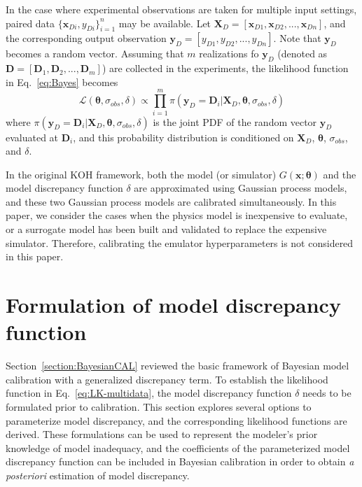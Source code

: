 \documentclass[preprint,review,12pt,3p]{elsarticle}
\begin{document}
In the case where experimental observations are taken for multiple input settings, paired data $\{ \boldsymbol{x}_{Di}, y_{Di} \}_{i=1}^{n}$ may be available. Let $\boldsymbol{X}_D = [ \boldsymbol{x}_{D1}, \boldsymbol{x}_{D2}, ..., \boldsymbol{x}_{Dn} ]$, and the corresponding output observation $\boldsymbol{y}_D =[ y_{D1}, y_{D2}, ..., y_{Dn} ]$. Note that $\boldsymbol{y}_D$ becomes a random vector. Assuming that $m$ realizations fo $\boldsymbol{y}_D$ (denoted as $\boldsymbol{D}=[\boldsymbol{D}_1, \boldsymbol{D}_2, ..., \boldsymbol{D}_m]$) are collected in the experiments, the likelihood function in Eq.~\ref{eq:Bayes} becomes
\begin{equation}\label{eq:LK-multidata}
\mathcal{L}(\boldsymbol{\theta},\sigma_{obs},\delta) \propto \prod_{i=1}^{m}\pi( \boldsymbol{y}_D=\boldsymbol{D}_i|\boldsymbol{X}_D,\boldsymbol{\theta},\sigma_{obs},\delta)
\end{equation}
where $\pi(\boldsymbol{y}_D=\boldsymbol{D}_i|\boldsymbol{X}_D,\boldsymbol{\theta},\sigma_{obs},\delta)$ is the joint PDF of the random vector $\boldsymbol{y}_D$ evaluated at $\boldsymbol{D}_i$, and this probability distribution is conditioned on $\boldsymbol{X}_D$, $\boldsymbol{\theta}$, $\sigma_{obs}$, and $\delta$.

In the original KOH framework, both the model (or simulator) $G(\boldsymbol{x};\boldsymbol{\theta})$ and the model discrepancy function $\delta$ are approximated using Gaussian process models, and these two Gaussian process models are calibrated simultaneously. In this paper, we consider the cases when the physics model is inexpensive to evaluate, or a surrogate model has been built and validated to replace the expensive simulator. Therefore, calibrating the emulator hyperparameters is not considered in this paper. 


\section{Formulation of model discrepancy function}\label{section:FormulationsDiscrepancy}
Section~\ref{section:BayesianCAL} reviewed the basic framework of Bayesian model calibration with a generalized discrepancy term. To establish the likelihood function in Eq.~\ref{eq:LK-multidata}, the model discrepancy function $\delta$ needs to be formulated prior to calibration. This section explores several options to parameterize model discrepancy, and the corresponding likelihood functions are derived. These formulations can be used to represent the modeler's prior knowledge of model inadequacy, and the coefficients of the parameterized model discrepancy function can be included in Bayesian calibration in order to obtain \textit{a posteriori} estimation of model discrepancy.
\end{document}
